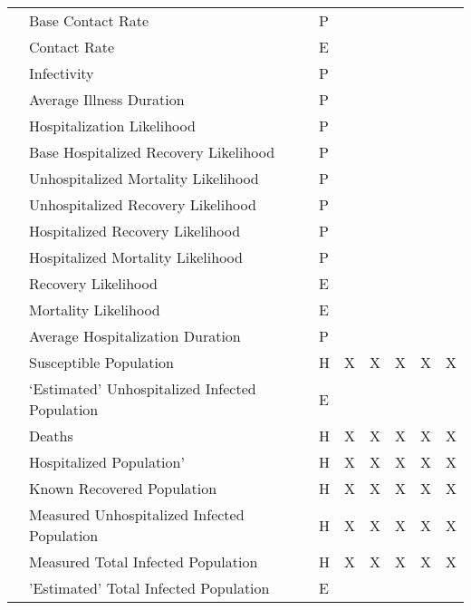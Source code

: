 \begin{center}
\begin{longtable}{|C{1.25cm}|C{2.5cm}|C{0.75cm}|C{1cm}|C{1cm}|C{1cm}|C{1.25cm}|C{1cm}|}
 & Base Contact Rate & P &  & & & & \\*  
& Contact Rate & E & & & & & \\* 
& Infectivity & P & & & & & \\* 
& Average Illness Duration & P & & & & & \\* 
& Hospitalization Likelihood & P & & & & & \\* 
& Base Hospitalized Recovery Likelihood & P & & & & & \\* 
& Unhospitalized Mortality Likelihood & P & & & & & \\* 
& Unhospitalized Recovery Likelihood & P & & & & & \\* 
& Hospitalized Recovery Likelihood & P & & & & & \\* 
& Hospitalized Mortality Likelihood & P & & & & & \\* 
& Recovery Likelihood & E & & & & & \\* 
& Mortality Likelihood & E & & & & & \\* 
& Average Hospitalization Duration & P & & & & & \\ \hline

 & Susceptible Population & H & X & X & X & X & X \\* 
& `Estimated' Unhospitalized Infected Population & E & & & & & \\* 
& Deaths & H & X & X & X & X & X \\ 
& Hospitalized Population' & H & X & X & X & X & X \\* 
& Known Recovered Population & H & X & X & X & X & X \\* 
& Measured Unhospitalized Infected Population & H & X & X & X & X & X \\* 
& Measured Total Infected Population & H & X & X & X & X & X \\* 
& 'Estimated' Total Infected Population & E & & & & & \\ \hline


\end{longtable}
\end{center}
